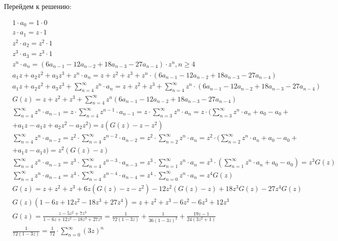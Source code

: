 \documentclass[a4paper,12pt,numbers=noenddot]{scrreprt}
\begin{document}
\begin{flushleft}
Перейдем к решению:

\begin{align}
    & 1 \cdot a_0 = 1 \cdot 0 \\&
    z \cdot a_1 = z \cdot 1 \\&
    z^2 \cdot a_2 = z^2 \cdot 1 \\&
    z^3 \cdot a_3 = z^3 \cdot 1 \\&
    z^n \cdot a_n = (6a_{n-1}-12a_{n-2}+18a_{n-3}-27a_{n-4}) \cdot z^n, n \geq 4\\&
    a_1 z + a_2 z^2 + a_3 z^3 + z^n \cdot a_n = z + z^2 + z^3 + z^n \cdot (6a_{n-1}-12a_{n-2}+18a_{n-3}-27a_{n-4}) \\&
    a_1 z + a_2 z^2 + a_3 z^3 + \sum_{n=4}^{\infty} z^n \cdot a_n = z + z^2 + z^3 + \sum_{n=4}^{\infty} z^n \cdot (6a_{n-1}-12a_{n-2}+18a_{n-3}-27a_{n-4}) \\&
    G(z) = z + z^2 + z^3 + \sum_{n=4}^{\infty} z^n (6a_{n-1}-12a_{n-2}+18a_{n-3}-27a_{n-4}) \\&
    \sum_{n=4}^{\infty} z^n \cdot a_{n-1} = z \cdot \sum_{n=4}^{\infty} z^{n-1} \cdot a_{n-1} = z \cdot \sum_{n=3}^{\infty} z^n \cdot a_n = z \cdot (\sum_{n=3}^{\infty} z^n \cdot a_n + a_0 - a_0 + \\&
    +a_1 z - a_1 z + a_2 z^2 - a_2 z^2) = z(G(z)-z-z^2) \\&
    \sum_{n=4}^{\infty} z^n \cdot a_{n-2} = z^2 \cdot \sum_{n=4}^{\infty} z^{n-2} \cdot a_{n-2} = z^2 \cdot \sum_{n=2}^{\infty} z^n \cdot a_n = z^2 \cdot (\sum_{n=2}^{\infty} z^n \cdot a_n + a_0 - a_0 + \\&
    +a_1 z - a_1 z) = z^2(G(z)-z) \\&
    \sum_{n=4}^{\infty} z^n \cdot a_{n-3} = z^3 \cdot \sum_{n=4}^{\infty} z^{n-3} \cdot a_{n-3} = z^3 \cdot \sum_{n=1}^{\infty} z^n \cdot a_n = z^3 \cdot (\sum_{n=1}^{\infty} z^n \cdot a_n + a_0 - a_0) = z^3 G(z) \\&
    \sum_{n=4}^{\infty} z^n \cdot a_{n-4} = z^4 \cdot \sum_{n=4}^{\infty} z^{n-4} \cdot a_{n-4} = z^4 \cdot \sum_{n=0}^{\infty} z^n \cdot a_n = z^4 G(z) \\&
    G(z)= z + z^2 + z^3 + 6z(G(z)-z-z^2)-12z^2(G(z)-z)+18z^3G(z)-27z^4G(z) \\&
    G(z)(1-6z+12z^2-18z^3+27z^4)=z+z^2+z^3-6z^2-6z^3+12z^3 \\&
    G(z)=\frac{z-5z^2+7z^3}{1-6z+12z^2-18z^3+27z^4} = \frac{1}{72(1-3z)}+\frac{1}{36(1-3z)^2}+\frac{19z-1}{24(3z^2+1)} \\&
    \frac{1}{72(1-3z)} = \frac{1}{72} \cdot \sum_{n=0}^{\infty} (3z)^n  \\&

\end{align}
\end{flushleft}
\end{document}
